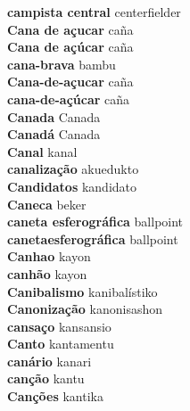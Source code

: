 \textbf{ campista central  } centerfielder \\
\textbf{ Cana de açucar  } caña \\
\textbf{ Cana de açúcar  } caña \\
\textbf{ cana-brava  } bambu \\
\textbf{ Cana-de-açucar  } caña \\
\textbf{ cana-de-açúcar  } caña \\
\textbf{ Canada  } Canada \\
\textbf{ Canadá  } Canada \\
\textbf{ Canal  } kanal \\
\textbf{ canalização  } akuedukto \\
\textbf{ Candidatos  } kandidato \\
\textbf{ Caneca  } beker \\
\textbf{ caneta esferográfica  } ballpoint \\
\textbf{ canetaesferográfica  } ballpoint \\
\textbf{ Canhao  } kayon \\
\textbf{ canhão  } kayon \\
\textbf{ Canibalismo  } kanibalístiko \\
\textbf{ Canonização  } kanonisashon \\
\textbf{ cansaço  } kansansio \\
\textbf{ Canto  } kantamentu \\
\textbf{ canário  } kanari \\
\textbf{ canção  } kantu \\
\textbf{ Canções  } kantika \\
